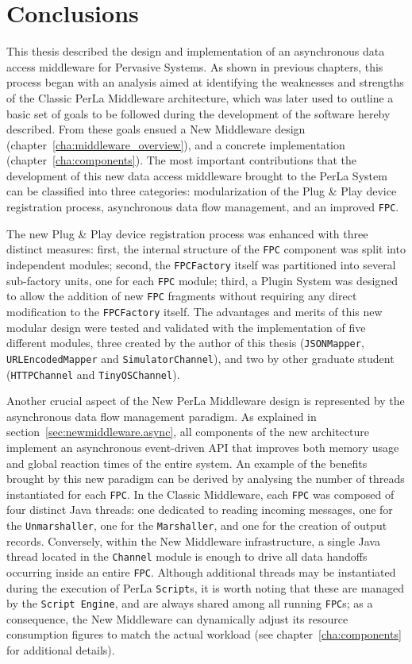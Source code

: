 \chapter{Conclusions}
\label{cha:conclusions}

This thesis described the design and implementation of an asynchronous data
access middleware for Pervasive Systems. As shown in previous chapters, this
process began with an analysis aimed at identifying the weaknesses and
strengths of the Classic PerLa Middleware architecture, which was later used to
outline a basic set of goals to be followed during the development of the
software hereby described. From these goals ensued a New Middleware design
(chapter~\ref{cha:middleware_overview}), and a concrete implementation
(chapter~\ref{cha:components}). The most important contributions that the
development of this new data access middleware brought to the PerLa System can
be classified into three categories: modularization of the Plug \& Play device
registration process, asynchronous data flow management, and an improved
\texttt{FPC}. 

The new Plug \& Play device registration process was enhanced with three
distinct measures: first, the internal structure of the \texttt{FPC} component
was split into independent modules; second, the \texttt{FPCFactory} itself was
partitioned into several sub-factory units, one for each \texttt{FPC} module;
third, a Plugin System was designed to allow the addition of new \texttt{FPC}
fragments without requiring any direct modification to the \texttt{FPCFactory}
itself. The advantages and merits of this new modular design were tested and
validated with the implementation of five different modules, three created by
the author of this thesis (\texttt{JSONMapper}, \texttt{URLEncodedMapper} and
\texttt{SimulatorChannel}), and two by other graduate student
(\texttt{HTTPChannel} and \texttt{TinyOSChannel}).

Another crucial aspect of the New PerLa Middleware design is represented by the
asynchronous data flow management paradigm. As explained in
section~\ref{sec:newmiddleware.async}, all components of the new architecture
implement an asynchronous event-driven API that improves both memory usage and
global reaction times of the entire system. An example of the benefits brought
by this new paradigm can be derived by analysing the number of threads
instantiated for each \texttt{FPC}. In the Classic Middleware, each
\texttt{FPC} was composed of four distinct Java threads: one dedicated to
reading incoming messages, one for the \texttt{Unmarshaller}, one for the
\texttt{Marshaller}, and one for the creation of output records. Conversely,
within the New Middleware infrastructure, a single Java thread located in the
\texttt{Channel} module is enough to drive all data handoffs occurring inside
an entire \texttt{FPC}. Although additional threads may be instantiated during
the execution of PerLa \texttt{Script}s, it is worth noting that these are
managed by the \texttt{Script Engine}, and are always shared among all running
\texttt{FPC}s; as a consequence, the New Middleware can dynamically adjust its
resource consumption figures to match the actual workload (see
chapter~\ref{cha:components} for additional details).

